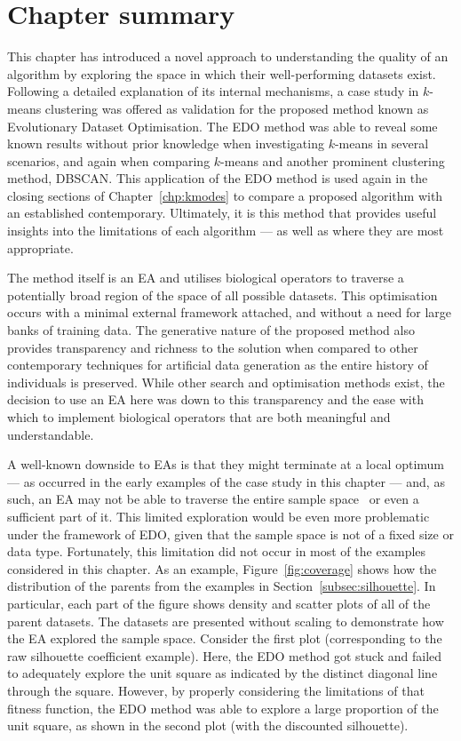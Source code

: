 
\section{Chapter summary}\label{sec:edo:summary}

This chapter has introduced a novel approach to understanding the quality of an
algorithm by exploring the space in which their well-performing datasets exist.
Following a detailed explanation of its internal mechanisms, a case study in
\(k\)-means clustering was offered as validation for the proposed method known
as Evolutionary Dataset Optimisation. The EDO method was able to reveal some
known results without prior knowledge when investigating \(k\)-means in several
scenarios, and again when comparing \(k\)-means and another prominent
clustering method, DBSCAN. This application of the EDO method is used again in
the closing sections of Chapter~\ref{chp:kmodes} to compare a proposed algorithm
with an established contemporary. Ultimately, it is this method that provides
useful insights into the limitations of each algorithm --- as well as where they
are most appropriate.

The method itself is an EA and utilises biological operators to traverse a
potentially broad region of the space of all possible datasets. This
optimisation occurs with a minimal external framework attached, and without a
need for large banks of training data. The generative nature of the proposed
method also provides transparency and richness to the solution when compared to
other contemporary techniques for artificial data generation as the entire
history of individuals is preserved. While other search and optimisation methods
exist, the decision to use an EA here was down to this transparency and the ease
with which to implement biological operators that are both meaningful and
understandable.

A well-known downside to EAs is that they might terminate at a local optimum ---
as occurred in the early examples of the case study in this chapter --- and, as
such, an EA may not be able to traverse the entire sample
space~\cite{Vikhar2016} or even a sufficient part of it. This limited
exploration would be even more problematic under the framework of EDO, given
that the sample space is not of a fixed size or data type. Fortunately, this
limitation did not occur in most of the examples considered in this chapter. As
an example, Figure~\ref{fig:coverage} shows how the distribution of the parents
from the examples in Section~\ref{subsec:silhouette}. In particular, each part
of the figure shows density and scatter plots of all of the parent datasets. The
datasets are presented without scaling to demonstrate how the EA explored the
sample space. Consider the first plot (corresponding to the raw silhouette
coefficient example). Here, the EDO method got stuck and failed to adequately
explore the unit square as indicated by the distinct diagonal line through the
square. However, by properly considering the limitations of that fitness
function, the EDO method was able to explore a large proportion of the unit
square, as shown in the second plot (with the discounted silhouette).

